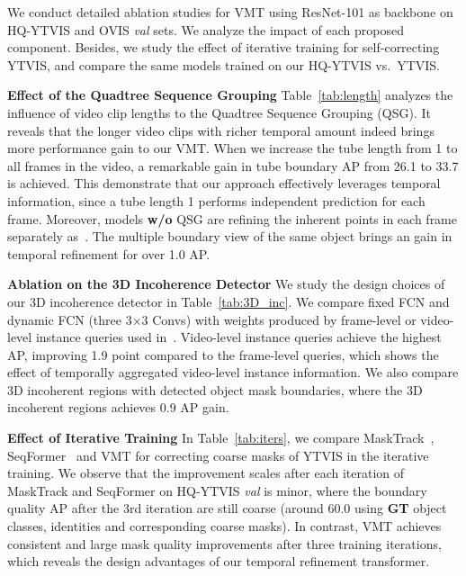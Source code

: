 \documentclass[runningheads]{llncs}
\newcommand{\parsection}[1]{\textbf{#1} }
\begin{document}
We conduct detailed ablation studies for VMT using ResNet-101 as backbone on HQ-YTVIS and OVIS \textit{val} sets. We analyze the impact of each proposed component. Besides, we study the effect of iterative training for self-correcting YTVIS, and compare the same models trained on our HQ-YTVIS vs.\ YTVIS.



\parsection{Effect of the Quadtree Sequence Grouping} 
Table~\ref{tab:length} analyzes the influence of video clip lengths to the Quadtree Sequence Grouping (QSG). It reveals that the longer video clips with richer temporal amount indeed brings more performance gain to our VMT. When we increase the tube length from 1 to all frames in the video, a remarkable gain in tube boundary AP from 26.1 to 33.7 is achieved. This demonstrate that our approach effectively leverages temporal information, since a tube length 1 performs independent prediction for each frame. Moreover, models \textbf{w/o} QSG are refining the inherent points in each frame separately as~\cite{transfiner}. The multiple boundary view of the same object brings an gain in temporal refinement for over 1.0 AP.

\parsection{Ablation on the 3D Incoherence Detector}
We study the design choices of our 3D incoherence detector in Table~\ref{tab:3D_inc}. We compare fixed FCN and dynamic FCN (three 3×3 Convs) with weights produced by frame-level or video-level instance queries used in~\cite{wu2021seqformer}. Video-level instance queries achieve the highest AP, improving 1.9 point compared to the frame-level queries, which shows the effect of temporally aggregated video-level instance information. We also compare 3D incoherent regions with detected object mask boundaries, where the 3D incoherent regions achieves 0.9 AP gain. 



\parsection{Effect of Iterative Training} 
In Table~\ref{tab:iters}, we compare MaskTrack~\cite{yang2019video}, SeqFormer~\cite{wu2021seqformer} and VMT for correcting coarse masks of YTVIS in the iterative training. We observe that the improvement scales after each iteration of MaskTrack and SeqFormer on HQ-YTVIS \textit{val} is minor, where the boundary quality AP after the 3rd iteration are still coarse (around 60.0 using \textbf{GT} object classes, identities and corresponding coarse masks). In contrast, VMT achieves consistent and large mask quality improvements after three training iterations, which reveals the design advantages of our temporal refinement transformer.
\end{document}
